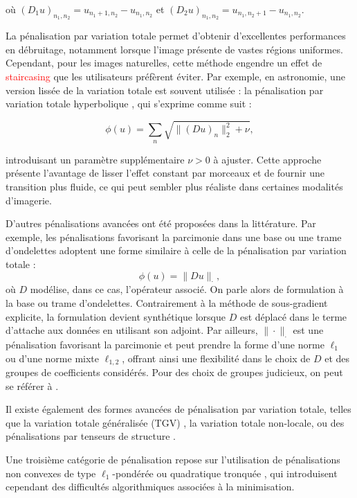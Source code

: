 \documentclass[a4paper, 12pt]{report} %
\begin{document}
où \((D_1 u)_{n_1,n_2} = u_{n_1+1,n_2} - u_{n_1,n_2}\) et \((D_2 u)_{n_1,n_2} = u_{n_1,n_2+1} - u_{n_1,n_2}\).

La pénalisation par variation totale permet d'obtenir d'excellentes performances en débruitage, notamment lorsque l'image présente de vastes régions uniformes. Cependant, pour les images naturelles, cette méthode engendre un effet de \textcolor{red}{staircasing}  que les utilisateurs préfèrent éviter. Par exemple, en astronomie, une version lissée de la variation totale est souvent utilisée : la pénalisation par variation totale hyperbolique \cite{charbonnier1997deterministic}, qui s'exprime comme suit :

\[
\phi(u) = \sum_{n} \sqrt{ \| (Du)_n \|_2^2 + \nu},
\]

introduisant un paramètre supplémentaire \(\nu > 0\) à ajuster. Cette approche présente l'avantage de lisser l'effet constant par morceaux et de fournir une transition plus fluide, ce qui peut sembler plus réaliste dans certaines modalités d'imagerie.

D'autres pénalisations avancées ont été proposées dans la littérature. Par exemple, les pénalisations favorisant la parcimonie dans une base ou une trame d'ondelettes \cite{jacques2011panorama} adoptent une forme similaire à celle de la pénalisation par variation totale :
\[
\phi(u) = \|Du\|_{\cdot},
\]
où \(D\) modélise, dans ce cas, l'opérateur associé. On parle alors de formulation à la base ou trame d’ondelettes. Contrairement à la méthode de sous-gradient explicite, la formulation devient synthétique lorsque \(D\) est déplacé dans le terme d'attache aux données en utilisant son adjoint. Par ailleurs, \(\| \cdot \|_{\cdot}\) est une pénalisation favorisant la parcimonie et peut prendre la forme d'une norme \(\ell_1\) ou d'une norme mixte \(\ell_{1,2}\), offrant ainsi une flexibilité dans le choix de \(D\) et des groupes de coefficients considérés. Pour des choix de groupes judicieux, on peut se référer à \cite{bach2012optimization}.

Il existe également des formes avancées de pénalisation par variation totale, telles que la variation totale généralisée (TGV) \cite{bredies2010total}, la variation totale non-locale, ou des pénalisations par tenseurs de structure \cite{chierchia2014nonlocal}.

Une troisième catégorie de pénalisation repose sur l’utilisation de pénalisations non convexes de type \(\ell_1\)-pondérée ou quadratique tronquée \cite{nikolova2005analysis}, qui introduisent cependant des difficultés algorithmiques associées à la minimisation.
\end{document}
